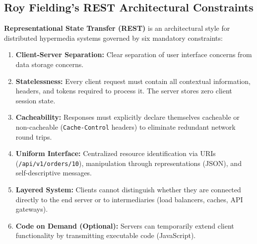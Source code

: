 \subsection{Roy Fielding's REST Architectural Constraints}
\textbf{Representational State Transfer (REST)} is an architectural style for distributed hypermedia systems governed by six mandatory constraints:
\begin{enumerate}
    \item \textbf{Client-Server Separation:} Clear separation of user interface concerns from data storage concerns.
    \item \textbf{Statelessness:} Every client request must contain all contextual information, headers, and tokens required to process it. The server stores zero client session state.
    \item \textbf{Cacheability:} Responses must explicitly declare themselves cacheable or non-cacheable (\texttt{Cache-Control} headers) to eliminate redundant network round trips.
    \item \textbf{Uniform Interface:} Centralized resource identification via URIs (\texttt{/api/v1/orders/10}), manipulation through representations (JSON), and self-descriptive messages.
    \item \textbf{Layered System:} Clients cannot distinguish whether they are connected directly to the end server or to intermediaries (load balancers, caches, API gateways).
    \item \textbf{Code on Demand (Optional):} Servers can temporarily extend client functionality by transmitting executable code (JavaScript).
\end{enumerate}

